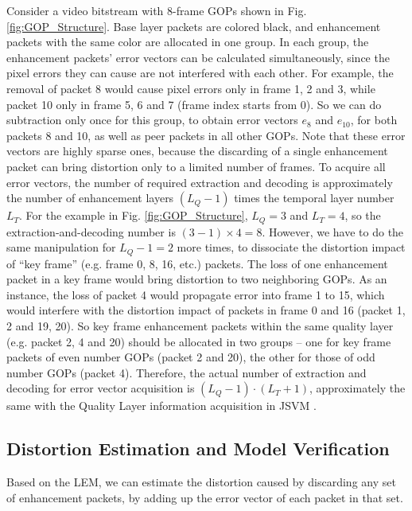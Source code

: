 \documentclass[journal]{IEEEtran}
\begin{document}
Consider a video bitstream with 8-frame GOPs shown in Fig. \ref{fig:GOP_Structure}. Base layer packets are colored black, and enhancement packets with the same color are allocated in one group. In each group, the enhancement packets' error vectors can be calculated simultaneously, since the pixel errors they can cause are not interfered with each other. For example, the removal of packet 8 would cause pixel errors only in frame 1, 2 and 3, while packet 10 only in frame 5, 6 and 7 (frame index starts from 0). So we can do subtraction only once for this group, to obtain error vectors $e_{8}$ and $e_{10}$, for both packets 8 and 10, as well as peer packets in all other GOPs. Note that these error vectors are highly sparse ones, because the discarding of a single enhancement packet can bring distortion only to a limited number of frames. To acquire all error vectors, the number of required extraction and decoding is approximately the number of enhancement layers $(L_Q - 1)$ times the temporal layer number $L_T$. For the example in Fig. \ref{fig:GOP_Structure}, $L_Q = 3$ and $L_T = 4$, so the extraction-and-decoding number is $(3 - 1) \times 4 = 8$. However, we have to do the same manipulation for $L_Q - 1 = 2$ more times, to dissociate the distortion impact of ``key frame'' \cite{H264Overview} (e.g. frame 0, 8, 16, etc.) packets. The loss of one enhancement packet in a key frame would bring distortion to two neighboring GOPs. As an instance, the loss of packet 4 would propagate error into frame 1 to 15, which would interfere with the distortion impact of packets in frame 0 and 16 (packet 1, 2 and 19, 20). So key frame enhancement packets within the same quality layer (e.g. packet 2, 4 and 20) should be allocated in two groups -- one for key frame packets of even number GOPs (packet 2 and 20), the other for those of odd number GOPs (packet 4). Therefore, the actual number of extraction and decoding for error vector acquisition is $(L_Q - 1) \cdot (L_T + 1)$, approximately the same with the Quality Layer information acquisition in JSVM \cite{Amonou07}.
 
\subsection{Distortion Estimation and Model Verification}
\label{subsec:distortion-estimation}

Based on the LEM, we can estimate the distortion caused by discarding any set of enhancement packets, by adding up the error vector of each packet in that set.
\end{document}
